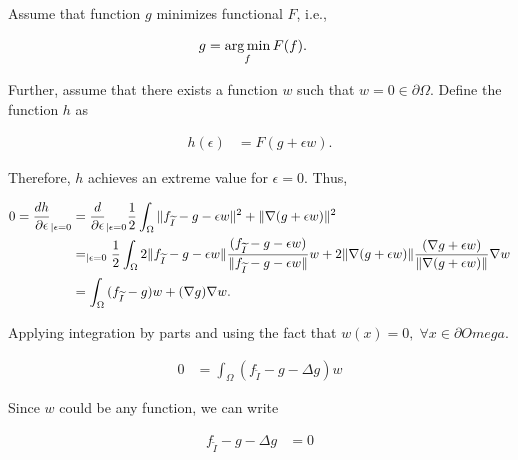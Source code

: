 Assume that function $g$ minimizes functional $F$, i.e.,

\begin{align*}
	g &= \operatorname*{arg\,min}_{f}{F(f)}.
\end{align*}

Further, assume that there exists a function $w$ such that $w=0 \in \partial \Omega$. Define the function $h$ as

\begin{align*}
	h(\epsilon) &= F(g+\epsilon w).
\end{align*}

Therefore, $h$ achieves an extreme value for $\epsilon=0$. Thus,

\begin{align*}
	0 = \frac{dh}{\partial \epsilon}_{| \epsilon=0} &= \frac{d}{\partial \epsilon}_{| \epsilon=0} \frac{1}{2} \int_{\Omega}{ \lVert f_{\widetilde{I}} - g - \epsilon w\rVert^2 + \lVert \nabla (g + \epsilon w) \rVert^2} \\
	&= _{| \epsilon = 0} \frac{1}{2} \int_{\Omega}{ 2\lVert f_{\widetilde{I}} - g - \epsilon w\rVert\frac{(f_{\widetilde{I}} - g - \epsilon w) }{\lVert f_{\widetilde{I}} - g - \epsilon w\rVert}w + 2\lVert \nabla (g + \epsilon w) \rVert\frac{(\nabla g + \epsilon w)}{\lVert \nabla (g + \epsilon w) \rVert}\nabla w} \\
	&= \int_{\Omega}{ (f_{\widetilde{I}} - g)w + (\nabla g)\nabla w}. 	
\end{align*}

Applying integration by parts and using the fact that $w(x)=0,\; \forall x \in \partial Omega$.

\begin{align*}
		0 &= \int_{\Omega} ( f_{\widetilde{I}} - g - \Delta g )w
\end{align*}

Since $w$ could be any function, we can write

\begin{align}
	f_{\widetilde{I}} - g - \Delta g &= 0
	\label{ch1:eq:variational-necessary-condition}
\end{align}


